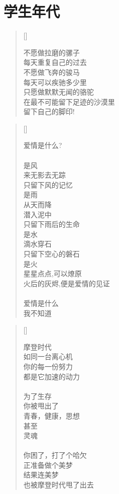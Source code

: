 \chapter{学生年代}
\thispagestyle{empty}
\renewcommand{\poemtoc}{subsection}
\settowidth{\versewidth}{不愿做拉磨的骡子}
\begin{verse}[\versewidth]

不愿做拉磨的骡子\\
每天重复自己的过去\\
不愿做飞奔的骏马\\
每天可以疾驰多少里\\
只愿做默默无闻的骆驼\\
在最不可能留下足迹的沙漠里\\
留下自己的脚印!
\end{verse}

\renewcommand{\poemtoc}{subsection}
\settowidth{\versewidth}{爱情是什么}
\begin{verse}[\versewidth]

爱情是什么?\\
~\\
是风\\
\vin  来无影去无踪\\
\vin  只留下风的记忆\\
是雨\\
\vin  从天而降\\
\vin  潜入泥中\\
\vin  只留下雨后的生命\\
是水\\
\vin  滴水穿石\\
\vin  只留下空心的磐石\\
是火\\
\vin  星星点点,可以燎原\\
\vin  火后的灰烬,便是爱情的见证\\
~\\
爱情是什么\\
我不知道\\
\end{verse}
\newpage

\renewcommand{\poemtoc}{subsection}
\settowidth{\versewidth}{摩登时代}
\begin{verse}[\versewidth]

摩登时代\\
如同一台离心机\\
你的每一份努力\\
都是它加速的动力\\
~\\
为了生存\\
你被甩出了\\
\vin   青春，健康，思想\\
甚至\\
\vin   灵魂\\
~\\
你困了，打了个哈欠\\
正准备做个美梦\\
结果连美梦\\
也被摩登时代甩了出去
\end{verse}

